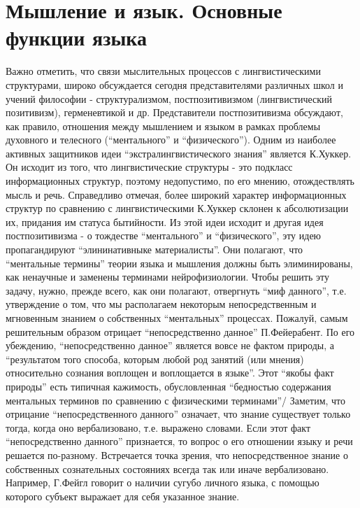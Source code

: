 \documentclass[12pt]{article}
\begin{document}
\section{Мышление и язык. Основные функции языка}
Важно отметить, что связи мыслительных процессов с лингвистическими структурами, широко обсуждается
сегодня  представителями  различных  школ  и  учений  философии  -  структурализмом,   постпозитивизмом
(лингвистический позитивизм), герменевтикой и др. Представители постпозитивизма обсуждают, как правило,
отношения  между  мышлением  и  языком  в  рамках  проблемы  духовного  и  телесного  (“ментального”  и
“физического”).  Одним  из  наиболее  активных  защитников  идеи  “экстралингвистического  знания”  является
К.Хуккер.  Он  исходит  из  того,  что  лингвистические  структуры  -  это  подкласс  информационных  структур,
поэтому недопустимо, по его мнению, отождествлять мысль и речь. Справедливо отмечая, более широкий
характер информационных структур по сравнению с лингвистическими К.Хуккер склонен к абсолютизации их,
придания  им  статуса  бытийности.  Из  этой  идеи  исходит  и  другая  идея  постпозитивизма  -  о  тождестве
“ментального” и “физического”, эту идею пропагандируют  “элининативныке материалисты”. Они полагают,
что “ментальные термины” теории языка и мышления должны быть элиминированы, как ненаучные и заменены
терминами нейрофизиологии. Чтобы решить эту задачу, нужно, прежде всего, как они полагают, отвергнуть
“миф  данного”,  т.е.  утверждение  о  том,  что  мы  располагаем  некоторым  непосредственным  и  мгновенным
знанием  о  собственных  “ментальных”  процессах.  Пожалуй,  самым   решительным  образом  отрицает
“непосредственно  данное”  П.Фейерабент.  По  его  убеждению, “непосредственно  данное”  является  вовсе не
фактом природы, а “результатом того способа, которым любой род занятий (или мнения) относительно сознания
воплощен  и  воплощается  в  языке”.  Этот  “якобы  факт  природы”  есть  типичная  кажимость,  обусловленная
“бедностью содержания ментальных терминов по сравнению с физическими терминами”/
Заметим, что отрицание “непосредственного данного” означает, что знание существует только тогда, когда оно
вербализовано, т.е. выражено словами. Если этот факт “непосредственно данного” признается, то вопрос о его
отношении  языку  и  речи  решается  по-разному.  Встречается  точка  зрения,  что  непосредственное  знание  о
собственных сознательных состояниях всегда так или иначе вербализовано.  Например, Г.Фейгл говорит о
наличии  сугубо  личного  языка,  с  помощью  которого  субъект  выражает  для  себя  указанное  знание.
\end{document}
